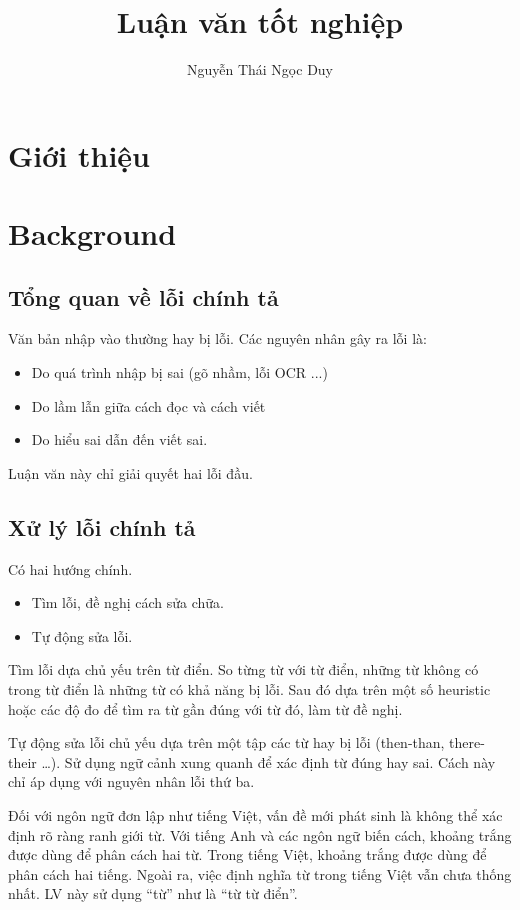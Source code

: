 \documentclass[a4paper]{book}
\title{Luận văn tốt nghiệp}
\author{Nguyễn Thái Ngọc Duy}
\begin{document}
\maketitle

\chapter{Giới thiệu}
\label{cha:intro}


\chapter{Background}
\label{cha:background}

\section{Tổng quan về lỗi chính tả}

Văn bản nhập vào thường hay bị lỗi. Các nguyên nhân gây ra lỗi là:
\begin{itemize}
\item Do quá trình nhập bị sai (gõ nhầm, lỗi OCR ...)
\item Do lầm lẫn giữa cách đọc và cách viết
\item Do hiểu sai dẫn đến viết sai.
\end{itemize}

Luận văn này chỉ giải quyết hai lỗi đầu.

\section{Xử lý lỗi chính tả}

Có hai hướng chính.
\begin{itemize}
\item Tìm lỗi, đề nghị cách sửa chữa.
\item Tự động sửa lỗi.
\end{itemize}

Tìm lỗi dựa chủ yếu trên từ điển. So từng từ với từ điển, những từ
không có trong từ điển là những từ có khả năng bị lỗi. Sau đó dựa trên
một số heuristic hoặc các độ đo để tìm ra từ gần đúng với từ đó, làm
từ đề nghị.

Tự động sửa lỗi chủ yếu dựa trên một tập các từ hay bị lỗi (then-than,
there-their \ldots). Sử dụng ngữ cảnh xung quanh để xác định từ đúng
hay sai. Cách này chỉ áp dụng với nguyên nhân lỗi thứ ba. 

Đối với ngôn ngữ đơn lập như tiếng Việt, vấn đề mới phát sinh là không
thể xác định rõ ràng ranh giới từ. Với tiếng Anh và các ngôn ngữ biến
cách, khoảng trắng được dùng để phân cách hai từ. Trong tiếng Việt,
khoảng trắng được dùng để phân cách hai tiếng. Ngoài ra, việc định
nghĩa từ trong tiếng Việt vẫn chưa thống nhất. LV này sử dụng ``từ''
như là ``từ từ điển''.
\end{document}
